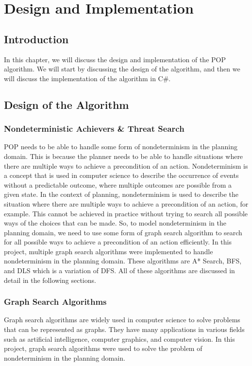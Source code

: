 \chapter{Design and Implementation}
\label{chap:design_and_implementation}


\section{Introduction}
In this chapter, we will discuss the design and implementation of the \ac{POP} algorithm.
We will start by discussing the design of the algorithm,
and then we will discuss the implementation of the algorithm in C\#.

\section{Design of the Algorithm}
\subsection{Nondeterministic Achievers \& Threat Search} \label {subsec:nondeterministic_achievers_threat_search}
\acf{POP} needs to be able to handle some form of nondeterminism in the planning domain. This is because the planner needs
to be able to handle situations where there are multiple ways to achieve a precondition
of an action. Nondeterminism is a concept that is used in computer science to describe the occurrence of events without a predictable outcome, where multiple outcomes are possible from a given state. In the context of planning, nondeterminism is used to describe the situation where there are multiple ways to achieve a precondition of an action, for example.
This cannot be achieved in practice without trying to search all possible ways of the choices that can be made.
So, to model nondeterminism in the planning domain, we need to use some form of graph search algorithm to search for all possible ways to achieve a precondition of an action efficiently. In this project, multiple graph search algorithms were implemented to handle nondeterminism in the planning domain. These algorithms are \ac{A*} Search, \ac{BFS}, and \ac{DLS} which is a variation of \ac{DFS}. All of these algorithms are discussed in detail in the following sections.


\subsection{Graph Search Algorithms} \label{subsec:graph_search_algorithms}
Graph search algorithms are widely used in computer science to solve problems that can be represented as graphs. They have many applications in various fields such as artificial intelligence, computer graphics, and computer vision. In this project, graph search algorithms were used to solve the problem of nondeterminism in the planning domain.
